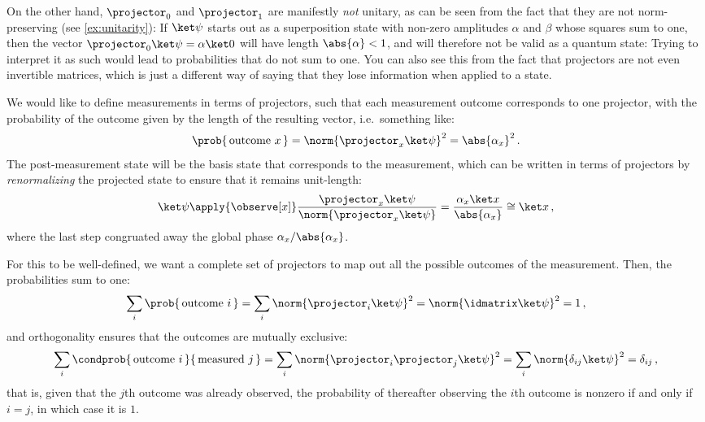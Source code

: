       On the other hand, $\projector_0$ and $\projector_1$ are manifestly
        \emph{not} unitary, as
        can be seen from the fact that they are not norm-preserving (see
        \cref{ex:unitarity}): If $\ket\psi$ starts out as a
        superposition state with non-zero amplitudes $\alpha$ and $\beta$ whose
        squares sum to one, then the vector 
        $\projector_0 \ket\psi = \alpha \ket 0$ will have
        length $\abs{\alpha} < 1$, and will therefore not be valid as a quantum
        state: Trying to interpret it as such would lead to probabilities that
        do not sum to one. 
        You can also see this from the fact that projectors
        are not even invertible matrices, which is just a different way
        of saying that they lose information when applied to a state.

      We would like to define
        measurements in terms of projectors, such that each measurement outcome
        corresponds to
        one projector, with the probability of the outcome given by the length
        of the resulting vector, i.e.\ something like:
      \[
         \prob{\, \text{outcome } x\, } = \norm{\projector_x \ket \psi}^2 
         = \abs{\alpha_x}^2\, .
      \]
      The post-measurement state will be the basis state that corresponds to the
      measurement, which can be written in terms of projectors by
      \emph{renormalizing} the projected state to ensure that it remains unit-length:
      \[
        \ket\psi \apply{\observe[x]} 
        \frac{
          \projector_x \ket \psi
        }{
          \norm{\projector_x \ket \psi}
        }
        = \frac{
          \alpha_x \ket x
        }{
          \abs{\alpha_x}
        }
        \cong \ket x\, ,
      \]
      where the last step congruated away the global phase
      $\alpha_x/\abs{\alpha_x}$.

      For this to be well-defined, we want a complete set of projectors to map out
        all the possible outcomes of the measurement. Then, 
        the probabilities sum to one:
      \[
        \sum_i \prob{\, \text{outcome } i\, } 
        = \sum_i \norm{\projector_i \ket \psi}^2 
        = \norm{\idmatrix \ket \psi}^2 
        = 1\, ,
      \]
      and orthogonality ensures that the outcomes are
      mutually exclusive:
      \[
        \sum_{i} \condprob{\, \text{outcome } i\, }{\, \text{measured } j\, }
        = \sum_{i} \norm{\projector_i \projector_j \ket \psi}^2 
        = \sum_{i} \norm{\delta_{ij} \ket \psi}^2 
        = \delta_{ij}\, ,
      \]
      that is, given that the $j$th outcome was already observed, the
      probability of thereafter observing the $i$th outcome is nonzero if and only
      if $i=j$, in which case it is $1$.

